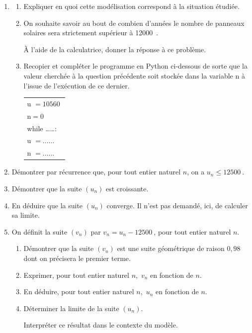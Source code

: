 \documentclass[10pt]{article}
\providecommand{\np}[2][]{{#2~#1}}
\begin{document}
\begin{enumerate}
\item 
	\begin{enumerate}
		\item  Expliquer en quoi cette modélisation correspond à la situation étudiée.
		\item  On souhaite savoir au bout de combien d'années le nombre de panneaux solaires sera strictement supérieur à \np{12000}.
		
À l'aide de la calculatrice, donner la réponse à ce
problème.
		\item  Recopier et compléter le programme en Python ci-dessous de sorte que la valeur
cherchée à la question précédente soit stockée dans la variable n à l'issue de l'exécution de ce dernier.
\begin{center}
\begin{tabular}{|l|}\hline
u $= \np{10560}$\\
n$ =0$\\
while  \ldots \ldots :\\
\qquad u $= \ldots \ldots$ \\
\qquad n $= \ldots \ldots$\\ \hline
\end{tabular}
\end{center}

	\end{enumerate}
\item Démontrer par récurrence que, pour tout entier naturel $n$, on a $u_n \leqslant \np{12500}$.
\item Démontrer que la suite $\left(u_n\right)$ est croissante.
\item En déduire que la suite $\left(u_n\right)$ converge. Il n'est pas demandé, ici, de calculer sa limite.
\item On définit la suite $\left(v_n\right)$  par $v_n = u_n - \np{12500}$, pour tout entier naturel $n$.
	\begin{enumerate}
		\item Démontrer que la suite $\left(v_n\right)$ est une suite géométrique de raison $0,98$ dont on précisera le premier terme.
		\item Exprimer, pour tout entier naturel $n$,\, $v_n$ en fonction de $n$.
		\item En déduire, pour tout entier naturel $n$,\, $u_n$ en fonction de $n$.
		\item Déterminer la limite de la suite $\left(u_n\right)$. 
		
Interpréter ce résultat dans le contexte du modèle.
	\end{enumerate}
\end{enumerate}
\end{document}
